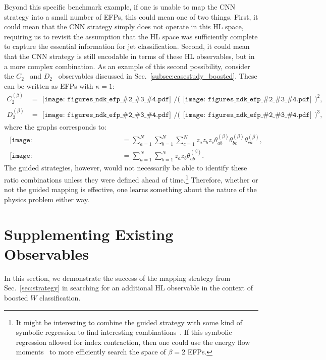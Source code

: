 \documentclass[aps,prd,twocolumn,superscriptaddress,preprintnumbers,nofootinbib,longbibliography,floatfix]{revtex4-1}
\newcommand{\Sec}[1]{Sec.~\ref{#1}}
\newcommand{\ndk}[4]{
	\begin{gathered}\texttt{[image: figures\_ndk\_efp\_\#2\_\#3\_\#4.pdf]}\end{gathered}
}
\begin{document}
Beyond this specific benchmark example, if one is unable to map the CNN strategy into a small number of EFPs, this could mean one of two things. First, it could mean that the CNN strategy simply does not operate in this HL space, requiring us to revisit the assumption that the HL space was sufficiently complete to capture the essential information for jet classification. Second, it could mean that the CNN strategy is still encodable in terms of these HL observables, but in a more complex combination. As an example of this second possibility, consider the $C_2$~\cite{Larkoski:2013eya} and $D_2$~\cite{Larkoski:2014gra} observables discussed in \Sec{subsec:casestudy_boosted}. These can be written as EFPs with $\kappa = 1$:
\begin{align}
	C^{(\beta)}_2 & = \ndk{0.045}{3}{3}{1} \bigg/ \bigg(\ndk{0.045}{2}{1}{0}\bigg)^2, \label{eq:C2EFP} \\
	D^{(\beta)}_2 & = \ndk{0.045}{3}{3}{1} \bigg/ \bigg(\ndk{0.045}{2}{1}{0}\bigg)^3, \label{eq:D2EFP}
\end{align}
where the graphs corresponds to:
\begin{align}
	\ndk{0.045}{3}{3}{1} & = \sum^N_{a=1} \sum^N_{b=1} \sum^N_{c=1} z_a z_b z_c \theta^{(\beta)}_{ab} \theta^{(\beta)}_{bc} \theta^{(\beta)}_{ca}, \label{eq:complete3} \\
	\ndk{0.045}{2}{1}{0} & = \sum^N_{a=1} \sum^N_{b=1} z_a z_b \theta^{(\beta)}_{ab} \label{eq:complete2}.
\end{align}
The guided strategies, however, would not necessarily be able to identify these ratio combinations unless they were defined ahead of time.\footnote{It might be interesting to combine the guided strategy with some kind of symbolic regression to find interesting combinations~\cite{Udrescu:2019mnk}.  If this symbolic regression allowed for index contraction, then one could use the energy flow moments~\cite{Komiske:2019asc} to more efficiently search the space of $\beta = 2$ EFPs.}
%
Therefore, whether or not the guided mapping is effective, one learns something about the nature of the physics problem either way.

\section{Supplementing Existing Observables}
\label{sec:supplementing}
In this section, we demonstrate the success of the mapping strategy from \Sec{sec:strategy} in searching for an additional HL observable in the context of boosted $W$ classification.
\end{document}
